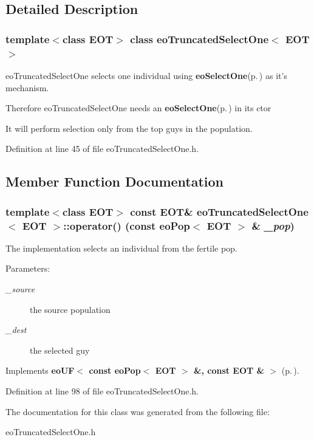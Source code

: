 \subsection{Detailed Description}
\subsubsection*{template$<$class EOT$>$ class eo\-Truncated\-Select\-One$<$ EOT $>$}

eo\-Truncated\-Select\-One selects one individual using {\bf eo\-Select\-One}{\rm (p.\,\pageref{classeo_select_one})} as it's mechanism. 

Therefore eo\-Truncated\-Select\-One needs an {\bf eo\-Select\-One}{\rm (p.\,\pageref{classeo_select_one})} in its ctor

It will perform selection only from the top guys in the population. 



Definition at line 45 of file eo\-Truncated\-Select\-One.h.

\subsection{Member Function Documentation}
\subsubsection{\setlength{\rightskip}{0pt plus 5cm}template$<$class EOT$>$ const {\bf EOT}\& {\bf eo\-Truncated\-Select\-One}$<$ {\bf EOT} $>$::operator() (const {\bf eo\-Pop}$<$ {\bf EOT} $>$ \& {\em \_\-pop})\hspace{0.3cm}{\tt  [inline, virtual]}}\label{classeo_truncated_select_one_a3}


The implementation selects an individual from the fertile pop. 

\begin{Desc}
\item[Parameters:]
\begin{description}
\item[{\em \_\-source}]the source population \item[{\em \_\-dest}]the selected guy \end{description}
\end{Desc}


Implements {\bf eo\-UF$<$ const eo\-Pop$<$ EOT $>$ \&, const EOT \& $>$} {\rm (p.\,\pageref{classeo_u_f_a1})}.

Definition at line 98 of file eo\-Truncated\-Select\-One.h.

The documentation for this class was generated from the following file:\begin{CompactItemize}
\item 
eo\-Truncated\-Select\-One.h\end{CompactItemize}
